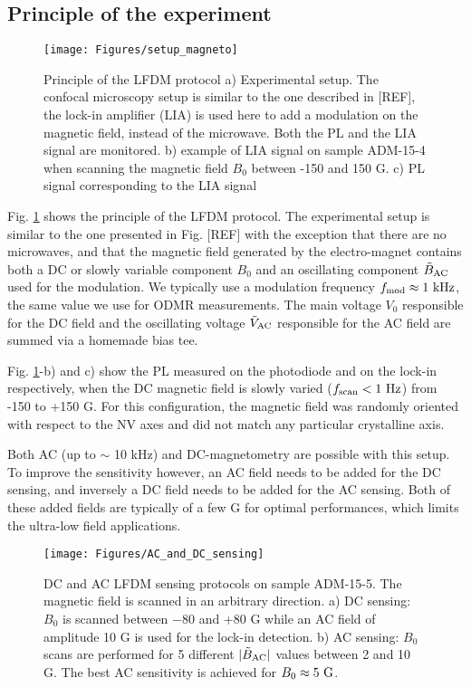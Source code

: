 \documentclass[a4paper,11pt]{report}
\begin{document}
\subsection{Principle of the experiment}

\begin{figure}[h!]
\centering
\texttt{[image: Figures/setup\_magneto]}
\caption{Principle of the LFDM protocol a) Experimental setup. The confocal microscopy setup is similar to the one described in [REF], the lock-in amplifier (LIA) is used here to add a modulation on the magnetic field, instead of the microwave. Both the PL and the LIA signal are monitored. b) example of LIA signal on sample ADM-15-4 when scanning the magnetic field $B_0$ between -150 and 150 G. c) PL signal corresponding to the LIA signal}
\label{setup magneto}
\end{figure}

Fig. \ref{setup magneto} shows the principle of the LFDM protocol. The experimental setup is similar to the one presented in Fig. [REF] with the exception that there are no microwaves, and that the magnetic field generated by the electro-magnet contains both a DC or slowly variable component $B_0$ and an oscillating component $\tilde{B}_{\rm AC}$ used for the modulation. We typically use a modulation frequency $f_{\rm mod} \approx 1\ \rm kHz$, the same value we use for ODMR measurements. The main voltage $V_0$ responsible for the DC field and the oscillating voltage $\tilde{V}_{\rm AC}$ responsible for the AC field are summed via a homemade bias tee.

Fig. \ref{setup magneto}-b) and c) show the PL measured on the photodiode and on the lock-in respectively, when the DC magnetic field is slowly varied ($f_{\rm scan}<1\ \rm Hz$) from -150 to +150 G. For this configuration, the magnetic field was randomly oriented with respect to the NV axes and did not match any particular crystalline axis.

Both AC (up to $\sim$ 10 kHz) and DC-magnetometry are possible with this setup. To improve the sensitivity however, an AC field needs to be added for the DC sensing, and inversely a DC field needs to be added for the AC sensing. Both of these added fields are typically of a few G for optimal performances, which limits the ultra-low field applications.

\begin{figure}[h!]
\centering
\texttt{[image: Figures/AC\_and\_DC\_sensing]}
\caption{DC and AC LFDM sensing protocols on sample ADM-15-5. The magnetic field is scanned in an arbitrary direction. a) DC sensing: $B_0$ is scanned between $-$80 and +80 G while an AC field of amplitude 10 G is used for the lock-in detection. b) AC sensing: $B_0$ scans are performed for 5 different $|\tilde B_{\rm AC}|$ values between 2 and 10 G. The best AC sensitivity is achieved for $B_0\approx 5\ \rm G$.}
\label{AC and DC sensing}
\end{figure}
\end{document}
